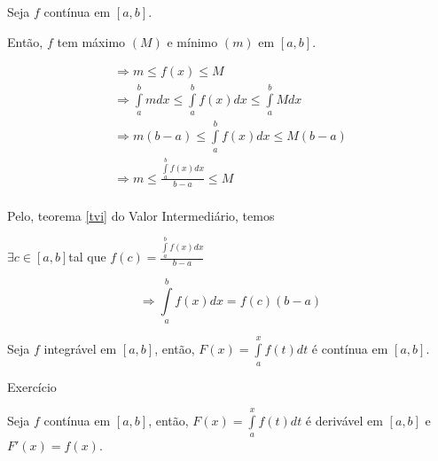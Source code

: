 \documentclass[11pt, oneside, a4paper]{gsm-l}
\begin{document}
\begin{dem}

Seja $f$ contínua em $\left[ {a,b} \right]$.

Então, $f$ tem máximo $\left( M \right)$ e mínimo $\left( m
\right)$ em $\left[ {a,b} \right]$.

\[
\begin{array}{l}
\Rightarrow m \leqslant f\left( x \right) \leqslant M \\
\Rightarrow \int\limits_a^b {mdx} \leqslant \int\limits_a^b {f\left( x
\right)dx} \leqslant \int\limits_a^b {Mdx} \\
\Rightarrow m\left( {b - a} \right) \leqslant \int\limits_a^b {f\left( x
\right)dx} \leqslant M\left( {b - a} \right) \\
\Rightarrow m \leqslant \frac{\int\limits_a^b {f\left( x \right)dx} }{b -
a} \leqslant M \\
\end{array}
\]


Pelo, teorema \ref{tvi} do Valor Intermediário, temos

$\exists c \in \left[ {a,b} \right]$tal que $f\left( c \right) =
\frac{\int\limits_a^b {f\left( x \right)dx} }{b - a}$

\[
\Rightarrow \int\limits_a^b {f\left( x \right)dx} = f\left( c \right)\left(
{b - a} \right)
\]


\end{dem}


\begin{teo}

Seja $f$ integrável em $\left[ {a,b} \right]$, então, $F\left( x
\right) = \int\limits_a^x {f\left( t \right)dt} $ é contínua em
$\left[ {a,b} \right]$.

\end{teo}



\begin{dem}

Exercício

\end{dem}



\begin{teo}

Seja $f$ contínua em $\left[ {a,b} \right]$, então, $F\left( x
\right) = \int\limits_a^x {f\left( t \right)dt} $ é derivável em
$\left[ {a,b} \right]$ e $F'\left( x \right) = f\left( x \right)$.

\end{teo}
\end{document}
